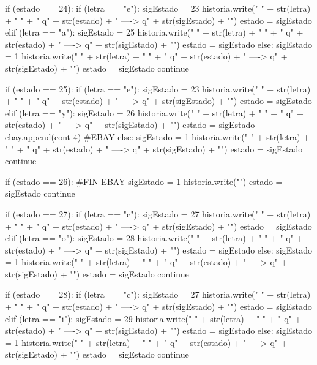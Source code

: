 \documentclass{article}
\begin{document}
\begin{python}
				if (estado == 24):             
					if (letra == "e"):
						sigEstado = 23
						historia.write(" { " + str(letra) + " } " + "  q" + str(estado) + "  ---->  q" + str(sigEstado) + "\n")
						estado = sigEstado            
					elif (letra == "a"):
						sigEstado = 25    
						historia.write(" { " + str(letra) + " } " + "  q" + str(estado) + "  ---->  q" + str(sigEstado) + "\n")
						estado = sigEstado                
					else:
						sigEstado = 1
						historia.write(" { " + str(letra) + " } " + "  q" + str(estado) + "  ---->  q" + str(sigEstado) + "\n")
						estado = sigEstado
					continue
			
				if (estado == 25):            
					if (letra == "e"):
						sigEstado = 23     
						historia.write(" { " + str(letra) + " } " + "  q" + str(estado) + "  ---->  q" + str(sigEstado) + "\n")
						estado = sigEstado            
					elif (letra == "y"):
						sigEstado = 26
						historia.write(" { " + str(letra) + " } " + "  q" + str(estado) + "  ---->  q" + str(sigEstado) + "\n")
						estado = sigEstado
						ebay.append(cont-4) #EBAY            
					else:
						sigEstado = 1
						historia.write(" { " + str(letra) + " } " + "  q" + str(estado) + "  ---->  q" + str(sigEstado) + "\n")
						estado = sigEstado
					continue        
			
				if (estado == 26): #FIN EBAY
					sigEstado = 1
					historia.write("\n")
					estado = sigEstado
				continue
			
				if (estado == 27):            
					if (letra == "c"):
						sigEstado = 27
						historia.write(" { " + str(letra) + " } " + "  q" + str(estado) + "  ---->  q" + str(sigEstado) + "\n")
						estado = sigEstado
					elif (letra == "o"):
						sigEstado = 28    
						historia.write(" { " + str(letra) + " } " + "  q" + str(estado) + "  ---->  q" + str(sigEstado) + "\n")
						estado = sigEstado         
					else:
						sigEstado = 1
						historia.write(" { " + str(letra) + " } " + "  q" + str(estado) + "  ---->  q" + str(sigEstado) + "\n")
						estado = sigEstado
					continue
			
				if (estado == 28):                  
					if (letra == "c"):
						sigEstado = 27
						historia.write(" { " + str(letra) + " } " + "  q" + str(estado) + "  ---->  q" + str(sigEstado) + "\n")
						estado = sigEstado              
					elif (letra == "i"):
						sigEstado = 29     
						historia.write(" { " + str(letra) + " } " + "  q" + str(estado) + "  ---->  q" + str(sigEstado) + "\n")
						estado = sigEstado        
					else:
						sigEstado = 1
						historia.write(" { " + str(letra) + " } " + "  q" + str(estado) + "  ---->  q" + str(sigEstado) + "\n")
						estado = sigEstado 
					continue
			

\end{python}
\end{document}
